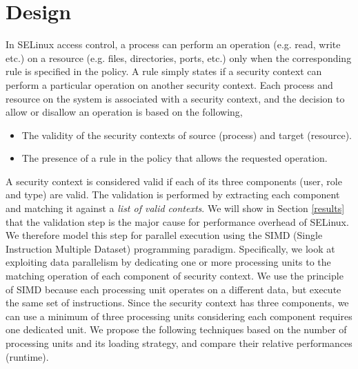 \documentclass[conference]{IEEEtran}
\newcommand{\eat}[1]{}
\begin{document}
\eat{
TBD some technique on how we optimize and the related work.. basically data structure level
}

\section{Design}\label{design}

In SELinux access control, a process can perform an operation
(e.g. read, write etc.) on a resource (e.g. files, directories, ports, etc.)
only when the corresponding rule is specified in the policy. A rule
simply states if a security context can perform a particular operation
on another security context. Each process and resource on the system
is associated with a security context, and the decision to allow or
disallow an operation is based on the following,

\begin{itemize}

\item The validity of the security contexts of source (process) and target (resource).
\item The presence of a rule in the policy that allows the requested operation. 

\end{itemize}

A security context is considered valid if each of its three components
(user, role and type) are valid. The validation is performed by
extracting each component and matching it against a \emph{list of
  valid contexts}. We will show in Section \ref{results} that the
validation step is the major cause for performance overhead of
SELinux. We therefore model this step for parallel execution using the
SIMD (Single Instruction Multiple Dataset) programming
paradigm. Specifically, we look at exploiting data parallelism by
dedicating one or more processing units to the matching operation of
each component of security context. We use the principle of SIMD
because each processing unit operates on a different data, but execute
the same set of instructions. Since the security context has three
components, we can use a minimum of three processing units considering
each component requires one dedicated unit. We propose the following
techniques based on the number of processing units and its loading
strategy, and compare their relative performances (runtime).
\end{document}
